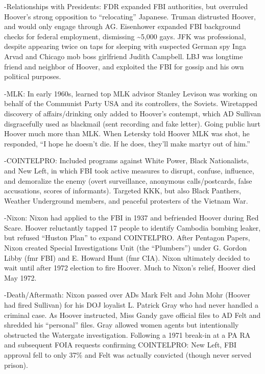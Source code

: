 \documentclass[
]{article}
\begin{document}
-Relationships with Presidents: FDR expanded FBI authorities, but
overruled Hoover's strong opposition to ``relocating'' Japanese. Truman
distrusted Hoover, and would only engage through AG. Eisenhower expanded
FBI background checks for federal employment, dismissing
\textasciitilde5,000 gays. JFK was professional, despite appearing twice
on taps for sleeping with suspected German spy Inga Arvad and Chicago
mob boss girlfriend Judith Campbell. LBJ was longtime friend and
neighbor of Hoover, and exploited the FBI for gossip and his own
political purposes.

-MLK: In early 1960s, learned top MLK advisor Stanley Levison was
working on behalf of the Communist Party USA and its controllers, the
Soviets. Wiretapped discovery of affairs/drinking only added to Hoover's
contempt, which AD Sullivan disgracefully used as blackmail (sent
recording and fake letter). Going public hurt Hoover much more than MLK.
When Letersky told Hoover MLK was shot, he responded, ``I hope he
doesn't die. If he does, they'll make martyr out of him.''

-COINTELPRO: Included programs against White Power, Black Nationalists,
and New Left, in which FBI took active measures to disrupt, confuse,
influence, and demoralize the enemy (overt surveillance, anonymous
calls/postcards, false accusations, scores of informants). Targeted KKK,
but also Black Panthers, Weather Underground members, and peaceful
protesters of the Vietnam War.

-Nixon: Nixon had applied to the FBI in 1937 and befriended Hoover
during Red Scare. Hoover reluctantly tapped 17 people to identify
Cambodia bombing leaker, but refused ``Huston Plan'' to expand
COINTELPRO. After Pentagon Papers, Nixon created Special Investigations
Unit (the ``Plumbers'') under G. Gordon Libby (fmr FBI) and E. Howard
Hunt (fmr CIA). Nixon ultimately decided to wait until after 1972
election to fire Hoover. Much to Nixon's relief, Hoover died May 1972.

-Death/Aftermath: Nixon passed over ADs Mark Felt and John Mohr (Hoover
had fired Sullivan) for his DOJ loyalist L. Patrick Gray who had never
handled a criminal case. As Hoover instructed, Miss Gandy gave official
files to AD Felt and shredded his ``personal'' files. Gray allowed women
agents but intentionally obstructed the Watergate investigation.
Following a 1971 break-in at a PA RA and subsequent FOIA requests
confirming COINTELPRO: New Left, FBI approval fell to only 37\% and Felt
was actually convicted (though never served prison).
\end{document}
